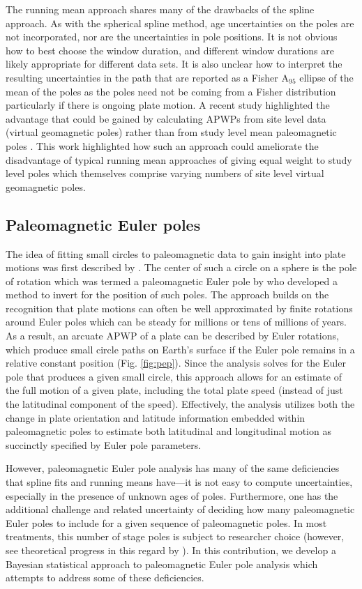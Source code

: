\documentclass[11pt,letterpaper]{article}
\begin{document}
The running mean approach shares many of the drawbacks of the spline approach. As with the spherical spline method, age uncertainties on the poles are not incorporated, nor are the uncertainties in pole positions. It is not obvious how to best choose the window duration, and different window durations are likely appropriate for different data sets. It is also unclear how to interpret the resulting uncertainties in the path that are reported as a Fisher A$_{95}$ ellipse of the mean of the poles as the poles need not be coming from a Fisher distribution particularly if there is ongoing plate motion. A recent study highlighted the advantage that could be gained by calculating APWPs from site level data (virtual geomagnetic poles) rather than from study level mean paleomagnetic poles \citep{Vaes2022a}. This work highlighted how such an approach could ameliorate the disadvantage of typical running mean approaches of giving equal weight to study level poles which themselves comprise varying numbers of site level virtual geomagnetic poles.

\subsection*{Paleomagnetic Euler poles}
The idea of fitting small circles to paleomagnetic data to gain insight into plate motions was first described by \cite{Francheteau1969a}. The center of such a circle on a sphere is the pole of rotation which was termed a paleomagnetic Euler pole by \cite{Gordon1984a} who developed a method to invert for the position of such poles. The approach builds on the recognition that plate motions can often be well approximated by finite rotations around Euler poles which can be steady for millions or tens of millions of years. As a result, an arcuate APWP of a plate can be described by Euler rotations, which produce small circle paths on Earth's surface if the Euler pole remains in a relative constant position (Fig. \ref{fig:pep}). Since the analysis solves for the Euler pole that produces a given small circle, this approach allows for an estimate of the full motion of a given plate, including the total plate speed (instead of just the latitudinal component of the speed). Effectively, the analysis utilizes both the change in plate orientation and latitude information embedded within paleomagnetic poles to estimate both latitudinal and longitudinal motion as succinctly specified by Euler pole parameters.

However, paleomagnetic Euler pole analysis has many of the same deficiencies that spline fits and running means have---it is not easy to compute uncertainties, especially in the presence of unknown ages of poles. Furthermore, one has the additional challenge and related uncertainty of deciding how many paleomagnetic Euler poles to include for a given sequence of paleomagnetic poles. In most treatments, this number of stage poles is subject to researcher choice (however, see theoretical progress in this regard by \citet{Gallo2022a}). In this contribution, we develop a Bayesian statistical approach to paleomagnetic Euler pole analysis which attempts to address some of these deficiencies.
\end{document}

